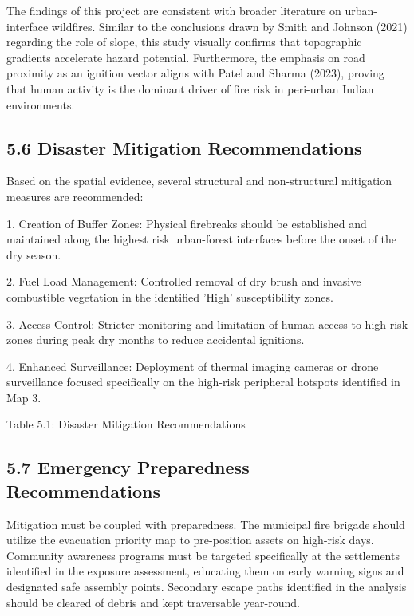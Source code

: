 \documentclass[12pt,a4paper]{article}
\begin{document}
The findings of this project are consistent with broader literature on urban-interface wildfires. Similar to the conclusions drawn by Smith and Johnson (2021) regarding the role of slope, this study visually confirms that topographic gradients accelerate hazard potential. Furthermore, the emphasis on road proximity as an ignition vector aligns with Patel and Sharma (2023), proving that human activity is the dominant driver of fire risk in peri-urban Indian environments.



\subsection*{5.6 Disaster Mitigation Recommendations}

Based on the spatial evidence, several structural and non-structural mitigation measures are recommended:


1. Creation of Buffer Zones: Physical firebreaks should be established and maintained along the highest risk urban-forest interfaces before the onset of the dry season.


2. Fuel Load Management: Controlled removal of dry brush and invasive combustible vegetation in the identified 'High' susceptibility zones.


3. Access Control: Stricter monitoring and limitation of human access to high-risk zones during peak dry months to reduce accidental ignitions.


4. Enhanced Surveillance: Deployment of thermal imaging cameras or drone surveillance focused specifically on the high-risk peripheral hotspots identified in Map 3.


Table 5.1: Disaster Mitigation Recommendations



\subsection*{5.7 Emergency Preparedness Recommendations}

Mitigation must be coupled with preparedness. The municipal fire brigade should utilize the evacuation priority map to pre-position assets on high-risk days. Community awareness programs must be targeted specifically at the settlements identified in the exposure assessment, educating them on early warning signs and designated safe assembly points. Secondary escape paths identified in the analysis should be cleared of debris and kept traversable year-round.
\end{document}

